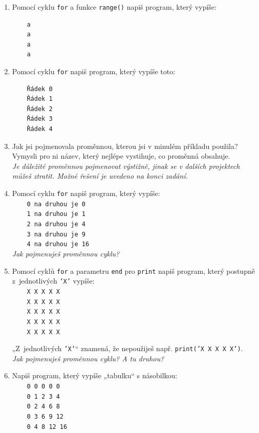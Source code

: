 \documentclass[a4paper,10pt]{article}
\begin{document}
\begin{enumerate}[resume]
\item Pomocí cyklu \verb+for+ a funkce \texttt{range()} napiš program, který vypíše:
\begin{verbatim}
    a
    a
    a
    a
\end{verbatim}

\item Pomocí cyklu \verb+for+ napiš program, který vypíše toto:
\begin{verbatim}
    Řádek 0
    Řádek 1
    Řádek 2
    Řádek 3
    Řádek 4
\end{verbatim}

\item Jak jsi pojmenovala proměnnou, kterou jsi v minulém příkladu použila?
    Vymysli pro ni název, který nejlépe vystihuje, co proměnná obsahuje.
    \\\emph{\small Je důležité proměnnou pojmenovat výstižně, jinak se v dalších projektech můžeš ztratit.
            Možné řešení je uvedeno na konci zadání.}
    \label{cisloradku}

\item Pomocí cyklu \verb+for+ napiš program, který vypíše:
\\\verb+    0 na druhou je 0+
\\\verb+    1 na druhou je 1+
\\\verb+    2 na druhou je 4+
\\\verb+    3 na druhou je 9+
\\\verb+    4 na druhou je 16+
    \\\emph{\small Jak pojmenuješ proměnnou cyklu?}

\item Pomocí cyklů \verb+for+ a parametru \verb+end+ pro \verb+print+ napiš
    program, který postupně z~jednotlivých \texttt{'X'} vypíše:
\\\verb+    X X X X X+
\\\verb+    X X X X X+
\\\verb+    X X X X X+
\\\verb+    X X X X X+
\\\verb+    X X X X X+

„Z~jednotlivých \texttt{'X'}“ znamená, že nepoužiješ např. \texttt{print('X X X X X')}.
    \\\emph{\small Jak pojmenuješ proměnnou cyklu? A tu druhou?}

\item Napiš program, který vypíše „tabulku“ s násobilkou:
\\\verb+    0 0 0 0 0+
\\\verb+    0 1 2 3 4+
\\\verb+    0 2 4 6 8+
\\\verb+    0 3 6 9 12+
\\\verb+    0 4 8 12 16+


\end{enumerate}
\end{document}

